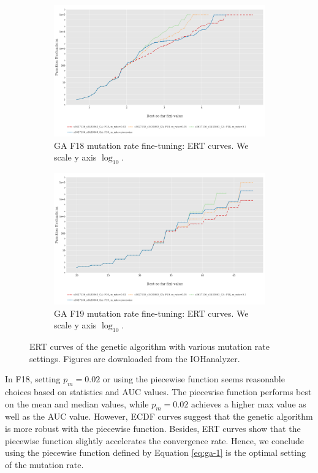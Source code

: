 \documentclass{article}
\begin{document}
\begin{figure}[!ht]
    \begin{subfigure}[h]{0.95\linewidth}
        \includegraphics[width=\linewidth]{ga/f18/mrate_ert.png}
        \caption{GA F18 mutation rate fine-tuning: ERT curves. We scale y axis $\log_{10}$.}
    \end{subfigure}
    \hfill
    \begin{subfigure}[h]{0.95\linewidth}
        \includegraphics[width=\linewidth]{ga/f19/mrate_ert.png}
        \caption{GA F19 mutation rate fine-tuning: ERT curves. We scale y axis $\log_{10}$.}
    \end{subfigure}
    \caption{ERT curves of the genetic algorithm with various mutation rate settings. Figures are downloaded from the IOHanalyzer.}
    \label{fig:experi-ga-mrate-ert}
\end{figure}

In F18, setting $p_m = 0.02$ or using the piecewise function seems reasonable choices based on statistics and AUC values. The piecewise function performs best on the mean and median values, while $p_m = 0.02$ achieves a higher max value as well as the AUC value. However, ECDF curves suggest that the genetic algorithm is more robust with the piecewise function. Besides, ERT curves show that the piecewise function slightly accelerates the convergence rate. Hence, we conclude using the piecewise function defined by Equation \ref{eq:ga-1} is the optimal setting of the mutation rate.
\end{document}
